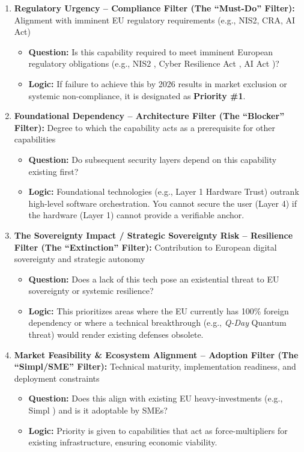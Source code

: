 \documentclass{ieeeaccess}
\begin{document}
\begin{enumerate}
     \item \textbf{Regulatory Urgency -- Compliance Filter (The ``Must-Do''  Filter):} Alignment with imminent EU regulatory requirements (e.g., NIS2, CRA, AI Act)
    \begin{itemize}
        \item \textbf{Question:} Is this capability required to meet imminent European regulatory obligations (e.g., NIS2 \cite{nis2}, Cyber Resilience Act \cite{cra}, AI Act \cite{aiact})?
        \item \textbf{Logic:} If failure to achieve this by 2026 results in market exclusion or systemic non-compliance, it is designated as \textbf{Priority \#1}.
    \end{itemize}
    
    
    \item \textbf{Foundational Dependency -- Architecture Filter (The ``Blocker''  Filter):} Degree to which the capability acts as a prerequisite for other capabilities
    \begin{itemize}
        \item \textbf{Question:} Do subsequent security layers depend on this capability existing first?
        \item \textbf{Logic:} Foundational technologies (e.g., Layer 1 Hardware Trust) outrank high-level software orchestration. You cannot secure the user (Layer 4) if the hardware (Layer 1) cannot provide a verifiable anchor.
    \end{itemize}
    
    
       \item \textbf{The Sovereignty Impact / Strategic Sovereignty Risk -- Resilience Filter (The ``Extinction''  Filter):} Contribution to European digital sovereignty and strategic autonomy

    \begin{itemize}
        \item \textbf{Question:} Does a lack of this tech pose an existential threat to EU sovereignty or systemic resilience?
        \item \textbf{Logic:} This prioritizes areas where the EU currently has 100\% foreign dependency or where a technical breakthrough (e.g., \textit{Q-Day} Quantum threat) would render existing defenses obsolete.
    \end{itemize}   
    \item \textbf{Market Feasibility \& Ecosystem Alignment -- Adoption Filter (The ``Simpl/SME'' Filter):} Technical maturity, implementation readiness, and deployment constraints
    \begin{itemize}
        \item \textbf{Question:} Does this align with existing EU heavy-investments (e.g., Simpl \cite{cloud_edge_roadmap}) and is it adoptable by SMEs?
        \item \textbf{Logic:} Priority is given to capabilities that act as force-multipliers for existing infrastructure, ensuring economic viability.
    \end{itemize}
\end{enumerate}
\end{document}
